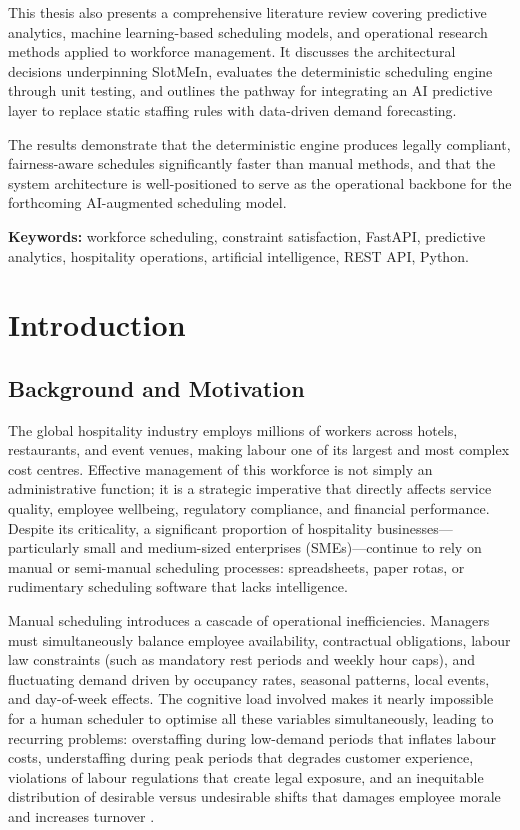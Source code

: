 \documentclass[12pt,a4paper]{report}
\begin{document}
This thesis also presents a comprehensive literature review covering predictive analytics, machine learning-based scheduling models, and operational research methods applied to workforce management. It discusses the architectural decisions underpinning SlotMeIn, evaluates the deterministic scheduling engine through unit testing, and outlines the pathway for integrating an AI predictive layer to replace static staffing rules with data-driven demand forecasting.

The results demonstrate that the deterministic engine produces legally compliant, fairness-aware schedules significantly faster than manual methods, and that the system architecture is well-positioned to serve as the operational backbone for the forthcoming AI-augmented scheduling model.

\textbf{Keywords:} workforce scheduling, constraint satisfaction, FastAPI, predictive analytics, hospitality operations, artificial intelligence, REST API, Python.

\chapter{Introduction}

\section{Background and Motivation}

The global hospitality industry employs millions of workers across hotels, restaurants, and event venues, making labour one of its largest and most complex cost centres. Effective management of this workforce is not simply an administrative function; it is a strategic imperative that directly affects service quality, employee wellbeing, regulatory compliance, and financial performance. Despite its criticality, a significant proportion of hospitality businesses—particularly small and medium-sized enterprises (SMEs)—continue to rely on manual or semi-manual scheduling processes: spreadsheets, paper rotas, or rudimentary scheduling software that lacks intelligence.

Manual scheduling introduces a cascade of operational inefficiencies. Managers must simultaneously balance employee availability, contractual obligations, labour law constraints (such as mandatory rest periods and weekly hour caps), and fluctuating demand driven by occupancy rates, seasonal patterns, local events, and day-of-week effects. The cognitive load involved makes it nearly impossible for a human scheduler to optimise all these variables simultaneously, leading to recurring problems: overstaffing during low-demand periods that inflates labour costs, understaffing during peak periods that degrades customer experience, violations of labour regulations that create legal exposure, and an inequitable distribution of desirable versus undesirable shifts that damages employee morale and increases turnover \cite{van_den_bergh_2013}.
\end{document}
